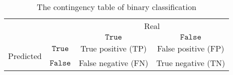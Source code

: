 \begin{table}[h]
\footnotesize
\centering
\caption{The contingency table of binary classification}
\label{tab:flow_prf1}
\begin{tabular}{lc|c|c|}
	\hline
	\multicolumn{2}{|l|}{\multirow{2}{*}{}}                             & \multicolumn{2}{c|}{Real}                                                                                           \\ \cline{3-4} 
	\multicolumn{2}{|l|}{}                                              & $\mathtt{True}$     & $\mathtt{False}$    \\ \hline
	\multicolumn{1}{|c|}{\multirow{2}{*}{Predicted}} & $\mathtt{True}$  & True positive (TP)  & False positive (FP) \\ \cline{2-4} 
	\multicolumn{1}{|c|}{}                           & $\mathtt{False}$ & False negative (FN) & True negative (TN)  \\ \hline
\end{tabular}
\end{table}